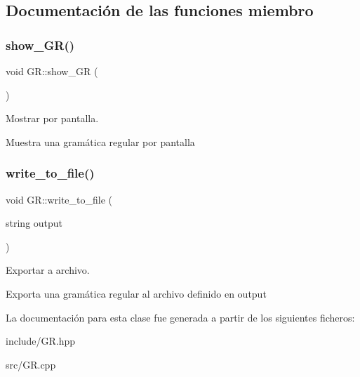\subsection{Documentación de las funciones miembro}
\mbox{\label{class_g_r_a1d67678144e903639687bf2935a1c88e}} 
\subsubsection{\texorpdfstring{show\+\_\+\+G\+R()}{show\_GR()}}
{\footnotesize\ttfamily void G\+R\+::show\+\_\+\+GR (\begin{DoxyParamCaption}{ }\end{DoxyParamCaption})}



Mostrar por pantalla. 

Muestra una gramática regular por pantalla \mbox{\label{class_g_r_a7c2b175ca3286a673ad4281807bf4cc6}} 
\subsubsection{\texorpdfstring{write\+\_\+to\+\_\+file()}{write\_to\_file()}}
{\footnotesize\ttfamily void G\+R\+::write\+\_\+to\+\_\+file (\begin{DoxyParamCaption}\item[{string}]{output }\end{DoxyParamCaption})}



Exportar a archivo. 

Exporta una gramática regular al archivo definido en output 

La documentación para esta clase fue generada a partir de los siguientes ficheros\+:\begin{DoxyCompactItemize}
\item 
include/G\+R.\+hpp\item 
src/G\+R.\+cpp\end{DoxyCompactItemize}
